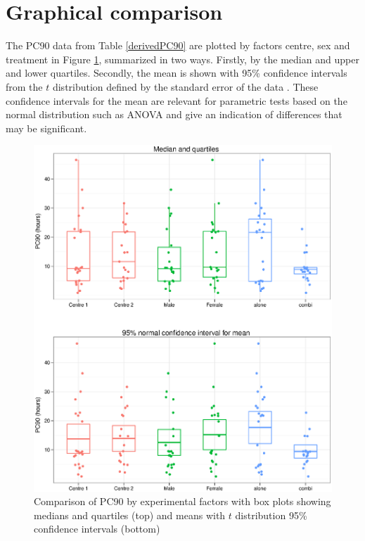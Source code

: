 \section{Graphical comparison}
The PC90 data from Table \ref{derivedPC90} are plotted by factors centre, sex and treatment in Figure \ref{pc90boxes}, summarized in two ways. Firstly, by the median and upper and lower quartiles. Secondly, the mean is shown with 95\% confidence intervals from the $t$ distribution defined by the standard error of the data%
. These confidence intervals for the mean are relevant for parametric tests based on the normal distribution such as ANOVA and give an indication of differences that may be significant.
\begin{figure}[h]
\includegraphics[width=150mm]{pc90boxes.eps} 
\caption{Comparison of PC90 by experimental factors with box plots showing medians and quartiles (top) and means with $t$ distribution 95\% confidence intervals (bottom)}
\label{pc90boxes}
\end{figure}

